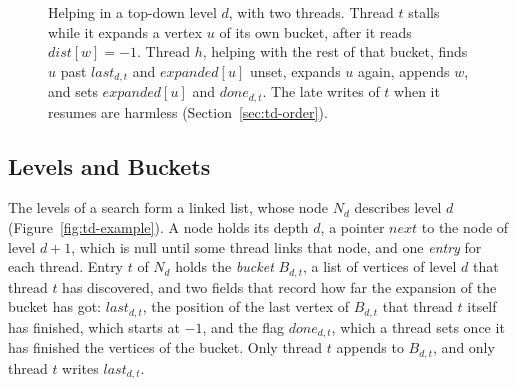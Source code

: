 \begin{figure}
    \caption{Helping in a top-down level $d$, with two threads. Thread $t$ stalls while it expands a vertex $u$ of its own bucket, after it reads $\mathit{dist}[w] = -1$. Thread $h$, helping with the rest of that bucket, finds $u$ past $\mathit{last}_{d,t}$ and $\mathit{expanded}[u]$ unset, expands $u$ again, appends $w$, and sets $\mathit{expanded}[u]$ and $\mathit{done}_{d,t}$. The late writes of $t$ when it resumes are harmless (Section~\ref{sec:td-order}).}
    \label{fig:td-protocol}
\end{figure}

\subsection{Levels and Buckets}
\label{sec:td-structure}

The levels of a search form a linked list, whose node $N_d$ describes level $d$ (Figure~\ref{fig:td-example}). A node holds its depth $d$, a pointer $\mathit{next}$ to the node of level $d+1$, which is null until some thread links that node, and one \emph{entry} for each thread. Entry $t$ of $N_d$ holds the \emph{bucket} $B_{d,t}$, a list of vertices of level $d$ that thread $t$ has discovered, and two fields that record how far the expansion of the bucket has got: $\mathit{last}_{d,t}$, the position of the last vertex of $B_{d,t}$ that thread $t$ itself has finished, which starts at $-1$, and the flag $\mathit{done}_{d,t}$, which a thread sets once it has finished the vertices of the bucket. Only thread $t$ appends to $B_{d,t}$, and only thread $t$ writes $\mathit{last}_{d,t}$.

